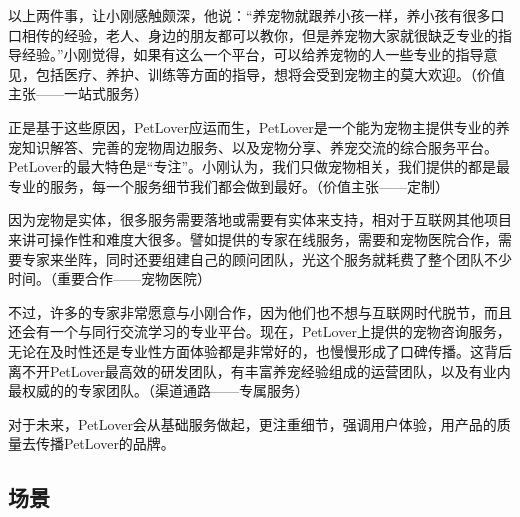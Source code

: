 \documentclass[a4paper]{ctexart}
\begin{document}
以上两件事，让小刚感触颇深，他说：“养宠物就跟养小孩一样，养小孩有很多口口相传的经验，老人、身边的朋友都可以教你，但是养宠物大家就很缺乏专业的指导经验。”小刚觉得，如果有这么一个平台，可以给养宠物的人一些专业的指导意见，包括医疗、养护、训练等方面的指导，想将会受到宠物主的莫大欢迎。（价值主张——一站式服务）

正是基于这些原因，PetLover应运而生，PetLover是一个能为宠物主提供专业的养宠知识解答、完善的宠物周边服务、以及宠物分享、养宠交流的综合服务平台。PetLover的最大特色是“专注”。小刚认为，我们只做宠物相关，我们提供的都是最专业的服务，每一个服务细节我们都会做到最好。（价值主张——定制）

因为宠物是实体，很多服务需要落地或需要有实体来支持，相对于互联网其他项目来讲可操作性和难度大很多。譬如提供的专家在线服务，需要和宠物医院合作，需要专家来坐阵，同时还要组建自己的顾问团队，光这个服务就耗费了整个团队不少时间。（重要合作——宠物医院）

不过，许多的专家非常愿意与小刚合作，因为他们也不想与互联网时代脱节，而且还会有一个与同行交流学习的专业平台。现在，PetLover上提供的宠物咨询服务，无论在及时性还是专业性方面体验都是非常好的，也慢慢形成了口碑传播。这背后离不开PetLover最高效的研发团队，有丰富养宠经验组成的运营团队，以及有业内最权威的的专家团队。（渠道通路——专属服务）

对于未来，PetLover会从基础服务做起，更注重细节，强调用户体验，用产品的质量去传播PetLover的品牌。
\subsection{场景}
\end{document}
